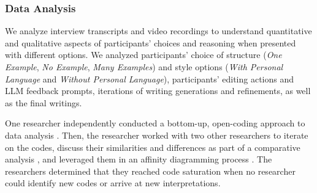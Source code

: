 \subsubsection{Data Analysis}
We analyze interview transcripts and video recordings to understand quantitative and qualitative aspects of participants' choices and reasoning when presented with different options. We analyzed participants' choice of structure (\textit{One Example}, \textit{No Example}, \textit{Many Examples}) and style options (\textit{With Personal Language} and \textit{Without Personal Language}), participants' editing actions and LLM feedback prompts, iterations of writing generations and refinements, as well as the final writings. 

One researcher independently conducted a bottom-up, open-coding approach to data analysis \cite{charmaz_constructing_2006}. Then, the researcher worked with two other researchers to iterate on the codes, discuss their similarities and differences as part of a comparative analysis \cite{merriam2015qualitative}, and leveraged them in an affinity diagramming process \cite{holtzblatt2017affinity}. The researchers determined that they reached code saturation when no researcher could identify new codes or arrive at new interpretations. 
















